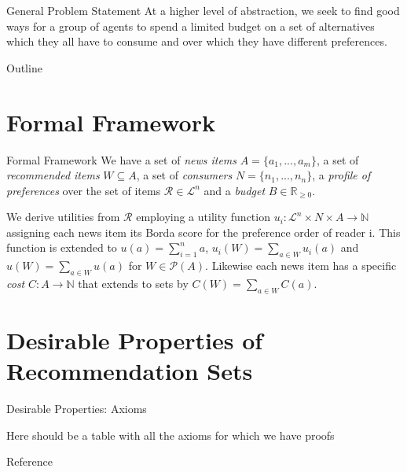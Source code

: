 \documentclass{beamer}
\begin{document}
\begin{frame}{General Problem Statement}
	At a higher level of abstraction, we seek to find good ways for a group of agents to spend a limited budget on a set of alternatives which they all have to consume and over which they have different preferences. 

\end{frame}

\begin{frame}{Outline}
	\tableofcontents
\end{frame}
	
\section{Formal Framework}

\begin{frame}{Formal Framework}
We have a set of \emph {news items} $A=\{a_1,...,a_m\}$, 
a set of \emph {recommended items} $W\subseteq A$, 
a set of \emph {consumers} $N=\{n_1,...,n_n\}$, 
a \emph {profile of preferences} over the set of items $\mathcal{R}\in \mathcal{L}^n$ 
and a \emph {budget} $B\in \mathbb{R}_{\geq 0}$. %

We derive utilities from $\mathcal{R}$ employing a utility function $u_i:\mathcal{L}^n \times N \times  A \rightarrow \mathbb{N}$ assigning each news item its Borda score for the preference order of reader i. This function is extended to $u(a)=\sum_{i=1}^n a$, $u_i(W)=\sum_{a\in W}u_i(a)$ and $u(W)=\sum_{a\in W}u(a)$ for $W\in \mathcal{P}(A)$. Likewise each news item has a specific \emph{cost} $C: A \rightarrow \mathbb {N}$ that extends to sets by $C(W)=\sum_{a\in W}C(a)$.

\end{frame}

\section{Desirable Properties of Recommendation Sets}

\begin{frame}{Desirable Properties: Axioms}

Here should be a table with all the axioms for which we have proofs



\begin{block}{Reference}
\end{block}

\end{frame}
\end{document}
